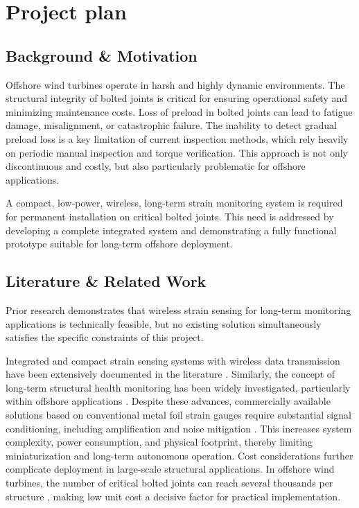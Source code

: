 \chapter{Project plan}
\section*{Background \& Motivation}
Offshore wind turbines operate in harsh and highly dynamic environments. The structural integrity of bolted joints is critical for ensuring operational safety and minimizing maintenance costs. Loss of preload in bolted joints can lead to fatigue damage, misalignment, or catastrophic failure. The inability to detect gradual preload loss is a key limitation of current inspection methods, which rely heavily on periodic manual inspection and torque verification. This approach is not only discontinuous and costly, but also particularly problematic for offshore applications.

A compact, low-power, wireless, long-term strain monitoring system is required for permanent installation on critical bolted joints. This need is addressed by developing a complete integrated system and demonstrating a fully functional prototype suitable for long-term offshore deployment.

\section*{Literature \& Related Work}
Prior research demonstrates that wireless strain sensing for long-term monitoring applications is technically feasible, but no existing solution simultaneously satisfies the specific constraints of this project.

Integrated and compact strain sensing systems with wireless data transmission have been extensively documented in the literature \cite{SHM_bog, wireless_strain_sensor}. Similarly, the concept of long-term structural health monitoring has been widely investigated, particularly within offshore applications \cite{offshore_sensor_solutions, WindTurbineStrainSensor, StrainBand}.
Despite these advances, commercially available solutions based on conventional metal foil strain gauges require substantial signal conditioning, including amplification and noise mitigation \cite{MetalFoilStrain}. This increases system complexity, power consumption, and physical footprint, thereby limiting miniaturization and long-term autonomous operation.
Cost considerations further complicate deployment in large-scale structural applications. In offshore wind turbines, the number of critical bolted joints can reach several thousands per structure \cite{6000bolts}, making low unit cost a decisive factor for practical implementation.

